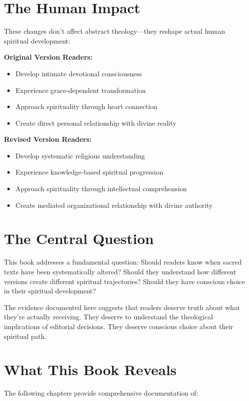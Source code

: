 \documentclass[11pt,twoside]{book}
\begin{document}
\section*{The Human Impact}
\label{sec:org9707f7f}

These changes don't affect abstract theology—they reshape actual human spiritual development:

\textbf{\textbf{Original Version Readers:}}
\begin{itemize}
\item Develop intimate devotional consciousness
\item Experience grace-dependent transformation
\item Approach spirituality through heart connection
\item Create direct personal relationship with divine reality
\end{itemize}

\textbf{\textbf{Revised Version Readers:}}
\begin{itemize}
\item Develop systematic religious understanding
\item Experience knowledge-based spiritual progression
\item Approach spirituality through intellectual comprehension
\item Create mediated organizational relationship with divine authority
\end{itemize}
\section*{The Central Question}
\label{sec:org84c8cf2}

This book addresses a fundamental question: Should readers know when sacred texts have been systematically altered? Should they understand how different versions create different spiritual trajectories? Should they have conscious choice in their spiritual development?

The evidence documented here suggests that readers deserve truth about what they're actually receiving. They deserve to understand the theological implications of editorial decisions. They deserve conscious choice about their spiritual path.
\section*{What This Book Reveals}
\label{sec:org0802271}

The following chapters provide comprehensive documentation of:
\end{document}

